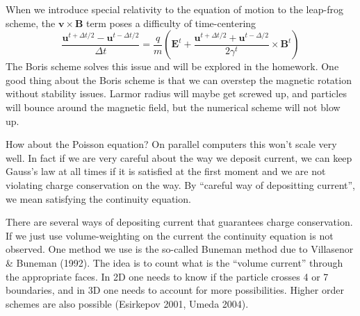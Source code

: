 \documentclass[letterpaper, 11pt]{article}
\numberwithin{equation}{section}
\numberwithin{figure}{section}
\begin{document}
When we introduce special relativity to the equation of motion to the leap-frog
scheme, the $\mathbf{v}\times \mathbf{B}$ term poses a difficulty of
time-centering
\begin{equation}
  \label{eq:4}
  \frac{\mathbf{u}^{t + \Delta t/2} - \mathbf{u}^{t - \Delta t/2}}{\Delta t} = \frac{q}{m}\left( \mathbf{E}^t + \frac{\mathbf{u}^{t+\Delta t/2} + \mathbf{u}^{t - \Delta/2}}{2\gamma^t}\times \mathbf{B}^t \right)
\end{equation}
The Boris scheme solves this issue and will be explored in the homework. One
good thing about the Boris scheme is that we can overstep the magnetic rotation
without stability issues. Larmor radius will maybe get screwed up, and particles
will bounce around the magnetic field, but the numerical scheme will not blow
up.

How about the Poisson equation? On parallel computers this won't scale very
well. In fact if we are very careful about the way we deposit current, we can
keep Gauss's law at all times if it is satisfied at the first moment and we are
not violating charge conservation on the way. By ``careful way of depositting
current'', we mean satisfying the continuity equation.

There are several ways of depositing current that guarantees charge
conservation. If we just use volume-weighting on the current the continuity
equation is not observed. One method we use is the so-called Buneman method due
to Villasenor \& Buneman (1992). The idea is to count what is the ``volume
current'' through the appropriate faces. In 2D one needs to know if the particle
crosses 4 or 7 boundaries, and in 3D one needs to account for more
possibilities. Higher order schemes are also possible (Esirkepov 2001, Umeda
2004).
\end{document}
